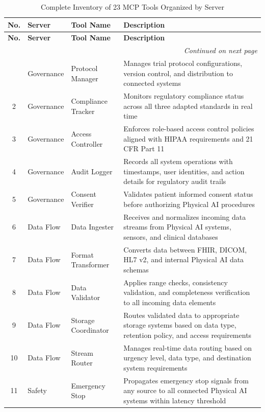 \begin{longtable}{c l l p{6.5cm}}
\caption{Complete Inventory of 23 MCP Tools Organized by Server}
\label{tab:mcp-all-tools} \\
\toprule
\textbf{No.} & \textbf{Server} & \textbf{Tool Name} & \textbf{Description} \\
\midrule
\endfirsthead
\toprule
\textbf{No.} & \textbf{Server} & \textbf{Tool Name} & \textbf{Description} \\
\midrule
\endhead
\midrule
\multicolumn{4}{r}{\textit{Continued on next page}} \\
\bottomrule
\endfoot
\bottomrule
\endlastfoot
1 & Governance & Protocol Manager & Manages trial protocol configurations, version control, and distribution to connected systems \\
2 & Governance & Compliance Tracker & Monitors regulatory compliance status across all three adapted standards in real time \\
3 & Governance & Access Controller & Enforces role-based access control policies aligned with HIPAA requirements and 21 CFR Part 11 \\
4 & Governance & Audit Logger & Records all system operations with timestamps, user identities, and action details for regulatory audit trails \\
5 & Governance & Consent Verifier & Validates patient informed consent status before authorizing Physical AI procedures \\
\midrule
6 & Data Flow & Data Ingester & Receives and normalizes incoming data streams from Physical AI systems, sensors, and clinical databases \\
7 & Data Flow & Format Transformer & Converts data between FHIR, DICOM, HL7 v2, and internal Physical AI data schemas \\
8 & Data Flow & Data Validator & Applies range checks, consistency validation, and completeness verification to all incoming data elements \\
9 & Data Flow & Storage Coordinator & Routes validated data to appropriate storage systems based on data type, retention policy, and access requirements \\
10 & Data Flow & Stream Router & Manages real-time data routing based on urgency level, data type, and destination system requirements \\
\midrule
11 & Safety & Emergency Stop & Propagates emergency stop signals from any source to all connected Physical AI systems within latency threshold \\

\end{longtable}
